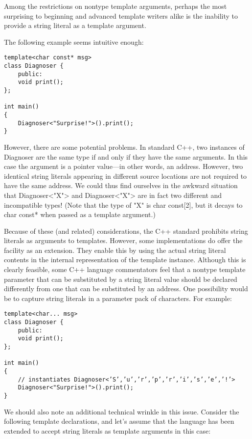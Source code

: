 Among the restrictions on nontype template arguments, perhaps the most surprising to beginning and advanced template writers alike is the inability to provide a string literal as a template argument.

The following example seems intuitive enough:

\begin{lstlisting}[style=styleCXX]
template<char const* msg>
class Diagnoser {
	public:
	void print();
};

int main()
{
	Diagnoser<"Surprise!">().print();
}
\end{lstlisting}

However, there are some potential problems. In standard C++, two instances of Diagnoser are the same type if and only if they have the same arguments. In this case the argument is a pointer value—in other words, an address. However, two identical string literals appearing in different source locations are not required to have the same address. We could thus find ourselves in the awkward situation that Diagnoser<"X"> and Diagnoser<"X"> are in fact two different and incompatible types! (Note that the type of "X" is char const[2], but it decays to char const* when passed as a template argument.)

Because of these (and related) considerations, the C++ standard prohibits string literals as arguments to templates. However, some implementations do offer the facility as an extension. They enable this by using the actual string literal contents in the internal representation of the template instance. Although this is clearly feasible, some C++ language commentators feel that a nontype template parameter that can be substituted by a string literal value should be declared differently from one that can be substituted by an address. One possibility would be to capture string literals in a parameter pack of characters. For example:

\begin{lstlisting}[style=styleCXX]
template<char... msg>
class Diagnoser {
	public:
	void print();
};

int main()
{
	// instantiates Diagnoser<’S’,’u’,’r’,’p’,’r’,’i’,’s’,’e’,’!’>
	Diagnoser<"Surprise!">().print();
}
\end{lstlisting}

We should also note an additional technical wrinkle in this issue. Consider the following template declarations, and let’s assume that the language has been extended to accept string literals as template arguments in this case:

